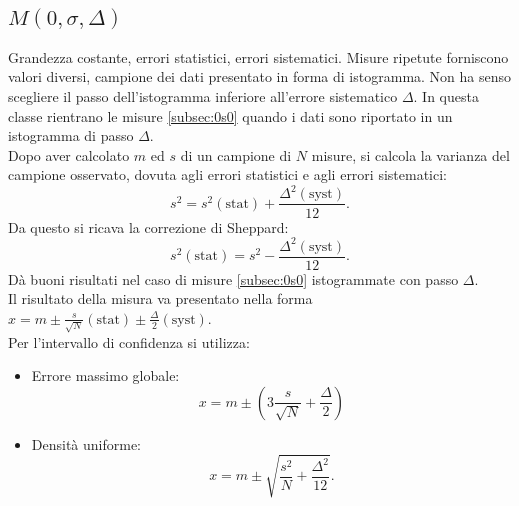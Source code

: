 \subsection{$M\left( 0,\sigma,\Delta \right) $} %
\label{subsec:0sD}
Grandezza costante, errori statistici, errori sistematici. Misure ripetute forniscono valori diversi, campione dei dati presentato in forma di istogramma. Non ha senso scegliere il passo dell'istogramma inferiore all'errore sistematico $\Delta$. In questa classe rientrano le misure \ref{subsec:0s0} quando i dati sono riportato in un istogramma di passo $\Delta$.
\\ Dopo aver calcolato $m$ ed $s$ di un campione di $N$ misure, si calcola la varianza del campione osservato, dovuta agli errori statistici e agli errori sistematici:
\begin{equation}
s^2=s^2\left( \textrm{stat}\right)+\frac{\Delta^2\left( \textrm{syst}\right)}{12}.
\end{equation}
Da questo si ricava la correzione di Sheppard:
\begin{equation}
\label{eq:corr-sheppard}
s^2\left( \textrm{stat}\right)=s^2-\frac{\Delta^2\left( \textrm{syst}\right)}{12}.
\end{equation}
Dà buoni risultati nel caso di misure \ref{subsec:0s0} istogrammate con passo $\Delta$.
\\ Il risultato della misura va presentato nella forma $x=m\pm \frac{s}{\sqrt{N}}\left( \textrm{stat}\right)\pm \frac{\Delta}{2}\left( \textrm{syst}\right) $.
\\ Per l'intervallo di confidenza si utilizza:
\begin{itemize}
\item Errore massimo globale:
\begin{equation}
x=m\pm \left( 3\frac { s }{ \sqrt { N }  } +\frac { \Delta  }{ 2 }  \right) 
\end{equation}
\item Densità uniforme: 
\begin{equation}
x=m\pm \sqrt { \frac { { s }^{ 2 } }{ N } +\frac { { \Delta  }^{ 2 } }{ 12 }  } .
\end{equation}
\end{itemize}

